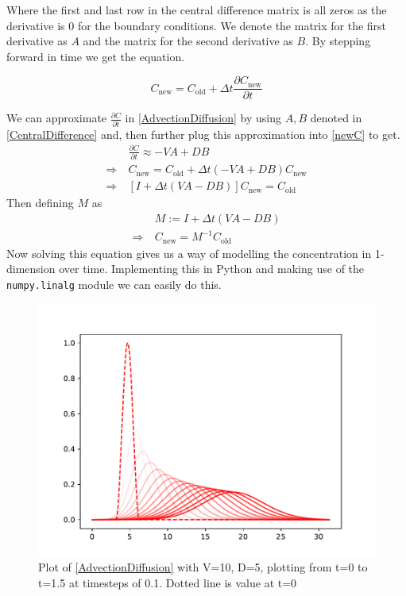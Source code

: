 \documentclass{article}
\begin{document}
{Where the first and last row in the central difference matrix is all zeros as the derivative is 0 for the boundary conditions.
We denote the matrix for the first derivative as $A$ and the matrix for the second derivative as $B$. By stepping forward in time we get the equation.

\begin{equation}
    C_{\mathrm{new}} = C_{\mathrm{old}} + \Delta t \frac{\partial C_{\mathrm{new}}}{\partial t}
    \label{newC}
\end{equation}

We can approximate $\frac{\partial C}{\partial t}$ in \eqref{AdvectionDiffusion} by using $A, B$ denoted in \eqref{CentralDifference} and, then further plug this approximation into \eqref{newC} to get.
\begin{equation}
    \begin{split}
        & \frac{\partial C}{\partial t} \approx -VA + DB \\
        \Longrightarrow \ & C_{\mathrm{new}} = C_{\mathrm{old}} + \Delta t (-VA + DB) C_{\mathrm{new}} \\
        \Longrightarrow \ & [I + \Delta t(VA - DB)]C_{\mathrm{new}} = C_{\mathrm{old}}
    \end{split}
\end{equation}
Then defining $M$ as
\begin{equation}
    \begin{split}
        & M := I + \Delta t(VA - DB) \\
        \Longrightarrow \ &  C_{\mathrm{new}} = M^{-1} C_{\mathrm{old}}
    \end{split}
\end{equation}
Now solving this equation gives us a way of modelling the concentration in 1-dimension over time. Implementing this in Python and making use of the \verb|numpy.linalg| module we can easily do this.

\begin{figure}[h]
    \centering
    \includegraphics{images/Figure_1_ODE2.pdf}
    \caption{Plot of \eqref{AdvectionDiffusion} with V=10, D=5, plotting from t=0 to t=1.5 at timesteps of 0.1. Dotted line is value at t=0}
    \label{fig:ODE}
\end{figure}

}
\end{document}
